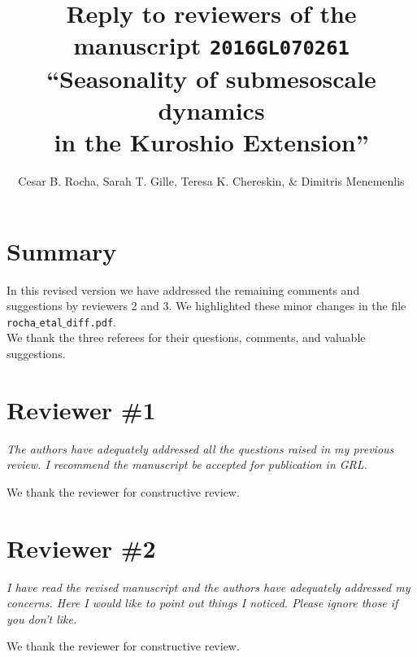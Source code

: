 \documentclass[11pt]{article}
\title{{\normalfont Reply to reviewers of the manuscript \texttt{2016GL070261} }
       ``Seasonality of submesoscale
       dynamics \\in the Kuroshio Extension''}
\author{Cesar B. Rocha,
        Sarah T. Gille, Teresa K. Chereskin, \& Dimitris Menemenlis}
\date{}
\newcommand{\bdp}{\begin{description}}
\newcommand{\edp}{\end{description}}
\begin{document}
%

\maketitle

\section*{Summary}

In this revised version we have addressed the remaining comments and suggestions
by reviewers 2 and 3. We highlighted these minor changes in the file \texttt{rocha$\_$etal$\_$diff.pdf}.\\

\noindent We thank the three referees for their questions, comments, and valuable suggestions.

\section{Reviewer \#1}

{\it The authors have adequately addressed all the questions raised in my
previous review. I recommend the manuscript be accepted for publication in GRL.}

\bdp
  \item We thank the reviewer for constructive review.
\edp

\section{Reviewer \#2}

{\it I have read the revised manuscript and the authors have adequately addressed
     my concerns. Here I would like to point out things I noticed.
     Please ignore those if you don't like.}

\bdp
   \item We thank the reviewer for constructive review.
\edp
\end{document}
